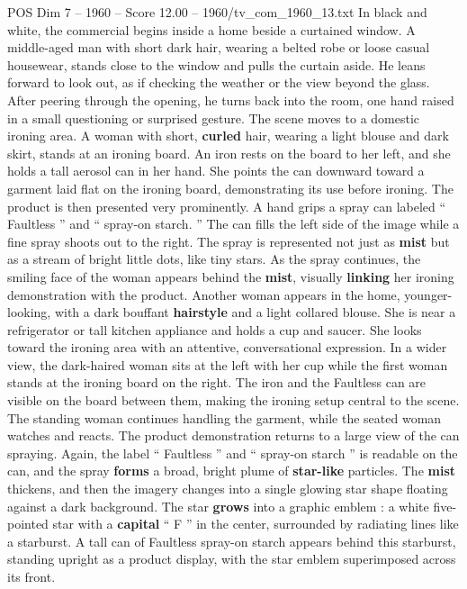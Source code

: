 \begin{textsample}{POS Dim 7 – 1960 – Score 12.00 – 1960/tv\_com\_1960\_13.txt}  \label{ex:f7_pos_028}
In black and white, the commercial begins inside a home beside a curtained window.
A middle-aged man with short dark hair, wearing a belted robe or loose casual housewear, stands close to the window and pulls the curtain aside.
He leans forward to look out, as if checking the weather or the view beyond the glass.
After peering through the opening, he turns back into the room, one hand raised in a small questioning or surprised gesture.
The scene moves to a domestic ironing area.
A woman with short, \textbf{curled} hair, wearing a light blouse and dark skirt, stands at an ironing board.
An iron rests on the board to her left, and she holds a tall aerosol can in her hand.
She points the can downward toward a garment laid flat on the ironing board, demonstrating its use before ironing.
The product is then presented very prominently.
A hand grips a spray can labeled “ Faultless ” and “ spray-on starch. ” The can fills the left side of the image while a fine spray shoots out to the right.
The spray is represented not just as \textbf{mist} but as a stream of bright little dots, like tiny stars.
As the spray continues, the smiling face of the woman appears behind the \textbf{mist}, visually \textbf{linking} her ironing demonstration with the product.
Another woman appears in the home, younger-looking, with a dark bouffant \textbf{hairstyle} and a light collared blouse.
She is near a refrigerator or tall kitchen appliance and holds a cup and saucer.
She looks toward the ironing area with an attentive, conversational expression.
In a wider view, the dark-haired woman sits at the left with her cup while the first woman stands at the ironing board on the right.
The iron and the Faultless can are visible on the board between them, making the ironing setup central to the scene.
The standing woman continues handling the garment, while the seated woman watches and reacts.
The product demonstration returns to a large view of the can spraying.
Again, the label “ Faultless ” and “ spray-on starch ” is readable on the can, and the spray \textbf{forms} a broad, bright plume of \textbf{star-like} particles.
The \textbf{mist} thickens, and then the imagery changes into a single glowing star shape floating against a dark background.
The star \textbf{grows} into a graphic emblem : a white five-pointed star with a \textbf{capital} “ F ” in the center, surrounded by radiating lines like a starburst.
A tall can of Faultless spray-on starch appears behind this starburst, standing upright as a product display, with the star emblem superimposed across its front.

\end{textsample}
